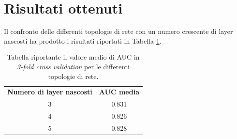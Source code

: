 \section{Risultati ottenuti}
Il confronto delle differenti topologie di rete con un numero crescente di layer nascosti ha prodotto i risultati riportati in Tabella \ref{tab:topology}.
\begin{table}
	\centering
	\caption{Tabella riportante il valore medio di AUC in \textit{3-fold cross validation} per le differenti topologie di rete.}
	\begin{tabular}{c|c}
		\label{tab:topology}
		\textbf{Numero di layer nascosti} & \textbf{AUC media} \\
		3 & 0.831 \\ 
		4 & 0.826 \\ 
		5 & 0.828 \\
	\end{tabular}
\end{table}

